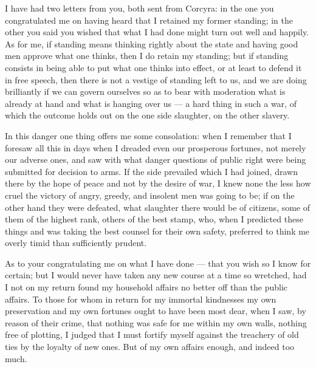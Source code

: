 

 I have had two letters from you, both sent from Corcyra: in the one you congratulated me on having heard that I retained my former standing; in the other you said you wished that what I had done might turn out well and happily. As for me, if standing means thinking rightly about the state and having good men approve what one thinks, then I do retain my standing; but if standing consists in being able to put what one thinks into effect, or at least to defend it in free speech, then there is not a vestige of standing left to us, and we are doing brilliantly if we can govern ourselves so as to bear with moderation what is already at hand and what is hanging over us --- a hard thing in such a war, of which the outcome holds out on the one side slaughter, on the other slavery.

 In this danger one thing offers me some consolation: when I remember that I foresaw all this in days when I dreaded even our prosperous fortunes, not merely our adverse ones, and saw with what danger questions of public right were being submitted for decision to arms. If the side prevailed which I had joined, drawn there by the hope of peace and not by the desire of war, I knew none the less how cruel the victory of angry, greedy, and insolent men was going to be; if on the other hand they were defeated, what slaughter there would be of citizens, some of them of the highest rank, others of the best stamp, who, when I predicted these things and was taking the best counsel for their own safety, preferred to think me overly timid than sufficiently prudent.

 As to your congratulating me on what I have done --- that you wish so I know for certain; but I would never have taken any new course at a time so wretched, had I not on my return found my household affairs no better off than the public affairs. To those for whom in return for my immortal kindnesses my own preservation and my own fortunes ought to have been most dear, when I saw, by reason of their crime, that nothing was safe for me within my own walls, nothing free of plotting, I judged that I must fortify myself against the treachery of old ties by the loyalty of new ones. But of my own affairs enough, and indeed too much.


